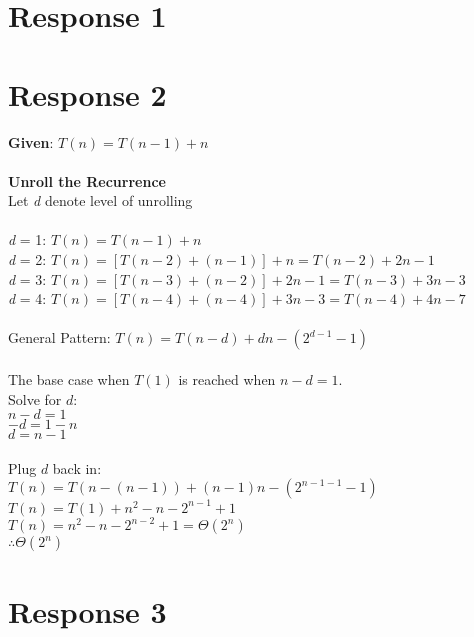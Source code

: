 \documentclass[12pt, a4paper]{article}
\begin{document}
\maketitle
\section*{\centering Response 1}

\section*{\centering Response 2}
    \textbf{Given}: \(T(n) = T(n-1) + n\)\\
    \\
    \textbf{Unroll the Recurrence}\\
    Let \textit{d} denote level of unrolling\\
    \\
    \textit{d} = 1: \(T(n) = T(n-1) + n\)\\
    \textit{d} = 2: \(T(n) = [T(n-2) + (n-1)] + n = T(n-2) + 2n - 1\)\\
    \textit{d} = 3: \(T(n) = [T(n-3) + (n-2)] + 2n - 1 = T(n-3) + 3n - 3\)\\
    \textit{d} = 4: \(T(n) = [T(n-4) + (n-4)] + 3n - 3 = T(n-4) + 4n - 7\)\\
    \\
    General Pattern: \(T(n) = T(n-d) + dn - (2^{d-1} - 1)\)\\
    \\
    The base case when \(T(1)\) is reached when \(n-d = 1\).\\
    Solve for \(d\): \\
    \(n - d = 1\)\\
    \(-d = 1-n\)\\
    \(d=n-1\) \\
    \\
    Plug \(d\) back in:\\
    \(T(n)=T(n-(n-1))+(n-1)n-(2^{n-1-1}-1)\)\\
    \(T(n)=T(1)+n^2-n-2^{n-1}+1\)\\
    \(T(n)=n^2-n-2^{n-2}+1 = \Theta{(2^n)}\)\\
    \(\therefore \Theta{(2^n)}\)
    \newpage

\section*{\centering Response 3}
\end{document}
